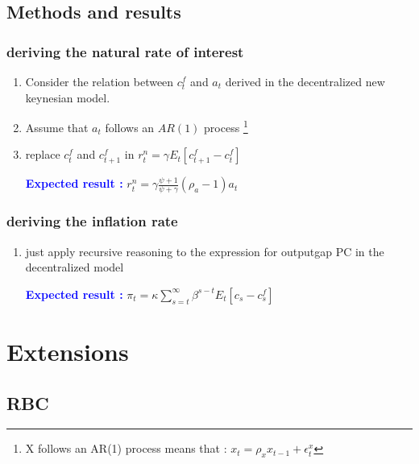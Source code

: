 \documentclass{article}
\begin{document}
\subsection{Methods and results}
\subsubsection{deriving the natural rate of interest}
\begin{enumerate}
    \item Consider the relation between $c_t^f$ and $a_t$ derived in the decentralized new keynesian model.
    \item Assume that $a_t$ follows an $AR(1)$ process \footnote{X follows an AR(1) process means that : $x_t=\rho_xx_{t-1}+\epsilon_t^x$}
    \item replace $c_t^f$ and $c_{t+1}^f$ in $r_t^n=\gamma E_t[c_{t+1}^f-c_t^f]$
    \begin{expectedresultsbox}
        \textcolor{blue}{\textbf{Expected result :}} $r_t^n=\gamma \frac{\psi+1}{\psi+\gamma}(\rho_a-1)a_t$
    \end{expectedresultsbox}
\end{enumerate}
\subsubsection{deriving the inflation rate}
\begin{enumerate}
    \item just apply recursive reasoning to the expression for outputgap PC in the decentralized model
    \begin{expectedresultsbox}
        \textcolor{blue}{\textbf{Expected result :}} $\pi_t=\kappa\sum_{s=t}^{\infty}\beta^{s-t}E_t[c_s-c_s^f]$
    \end{expectedresultsbox}
\end{enumerate}


\section{Extensions}

\subsection{RBC}
\end{document}
